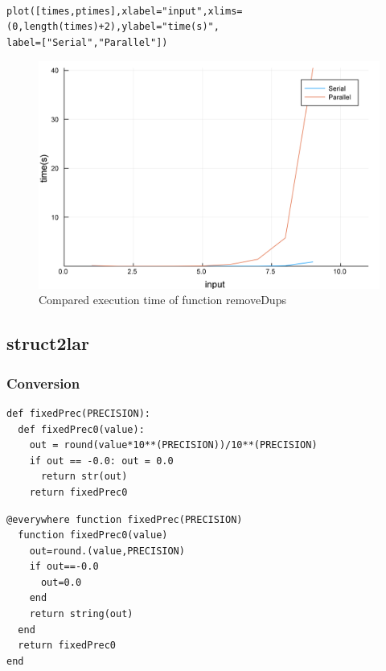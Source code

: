 \documentclass[a4paper,12pt]{article}
\begin{document}
\noindent{}
\begin{Verbatim}[fontsize=\footnotesize]

plot([times,ptimes],xlabel="input",xlims=(0,length(times)+2),ylabel="time(s)",
label=["Serial","Parallel"])

\end{Verbatim}

\begin{figure}[!h]
	\centering
	\includegraphics[scale=0.08]{removeDupsC.png}
	\caption{Compared execution time of function removeDups}
\end{figure}
\newpage

\subsection{struct2lar}
\subsubsection{Conversion}
\noindent {}
\begin{multicols}{2}
\noindent {}
\begin{Verbatim}[fontsize=\scriptsize]
def fixedPrec(PRECISION):
  def fixedPrec0(value):
    out = round(value*10**(PRECISION))/10**(PRECISION)
    if out == -0.0: out = 0.0
      return str(out)
    return fixedPrec0 
\end{Verbatim}
\columnbreak
{}
\begin{Verbatim}[fontsize=\scriptsize]
@everywhere function fixedPrec(PRECISION)
  function fixedPrec0(value) 
    out=round.(value,PRECISION)
    if out==-0.0
      out=0.0
    end
    return string(out)
  end
  return fixedPrec0
end
\end{Verbatim}
\end{multicols}
\end{document}
